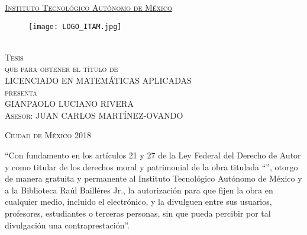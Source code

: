 \documentclass[../Main/Main.tex]{subfiles}
\begin{document}

\begin{titlepage}
\begin{center}

\underline{\textsc{\Large Instituto Tecnológico Autónomo de México}}\\[3em]

\begin{figure}[h]
\begin{center}
\texttt{[image: LOGO\_ITAM.jpg]}
\end{center}
\end{figure}

\vspace{2em}

\textsc{\LARGE \textbf{\tituloMayus}}\\[2em]

\textsc{\large Tesis}\\[1em]

\textsc{que para obtener el título de}\\[1em]

\textsc{LICENCIADO EN MATEMÁTICAS APLICADAS}\\[1em]

\textsc{presenta}\\[1em]

\textsc{\Large GIANPAOLO LUCIANO RIVERA}\\[1em]

\textsc{\large Asesor: JUAN CARLOS MARTÍNEZ-OVANDO}

\end{center}

\vspace*{\fill}
\textsc{Ciudad de México \hspace*{\fill} 2018}

\end{titlepage}

\thispagestyle{empty}
\begingroup
``Con fundamento en los artículos 21 y 27 de la Ley Federal del Derecho de Autor y como titular de los derechos moral y patrimonial de la obra titulada ``\textbf{\tituloMayus}'', otorgo de manera gratuita y permanente al Instituto Tecnológico Autónomo de México y a la Biblioteca Raúl Bailléres Jr., la autorización para que fijen la obra en cualquier medio, incluido el electrónico, y la divulguen entre sus usuarios, profesores, estudiantes o terceras personas, sin que pueda percibir por tal divulgación una contraprestación''.
\end{document}
